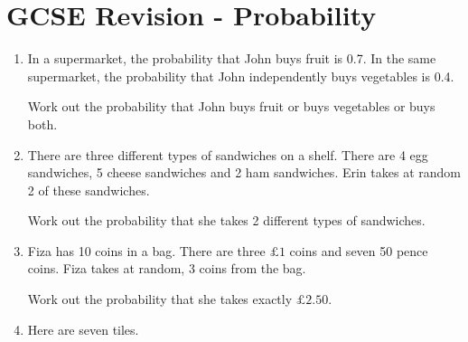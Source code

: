 
\chapter{GCSE Revision - Probability}

\begin{enumerate}
  \item In a supermarket, the probability that John buys fruit is 0.7. In the same supermarket, the probability that John independently buys vegetables is 0.4.\par 
  Work out the probability that John buys fruit or buys vegetables or buys both.\\[3cm]\vspace*{0pt}\hfill\dline
  \item There are three different types of sandwiches on a shelf. There are 4 egg sandwiches, 5 cheese sandwiches and 2 ham sandwiches. Erin takes at random 2 of these sandwiches.\par 
  Work out the probability that she takes 2 different types of sandwiches.
  \newpage
  \item Fiza has 10 coins in a bag. There are three $\pounds 1$ coins and seven 50 pence coins. Fiza takes at random, 3 coins from the bag.\par
  Work out the probability that she takes exactly $\pounds 2.50$.
  \item Here are seven tiles.
  \begin{figure}[H]
    \centering
\end{figure}
\end{enumerate}
